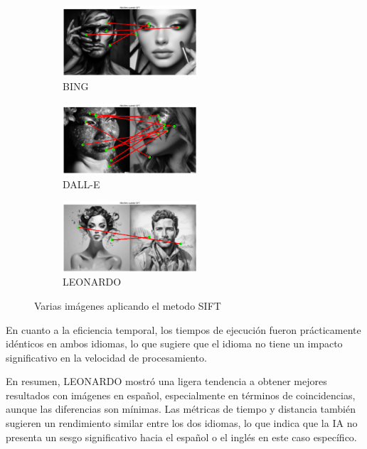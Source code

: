 \documentclass[unnumsec,webpdf,modern,large]{mam-authoring-template}
\theoremstyle{thmstyleone}%
\theoremstyle{thmstyletwo}%
\theoremstyle{thmstylethree}%
\begin{document}
\begin{figure}[htp]
    \centering
    \begin{subfigure}[]{}
        \includegraphics[width=5cm]{bing101.png}
        \caption{BING}
    \end{subfigure}
    \begin{subfigure}[]{}
        \includegraphics[width=5cm]{dall101.png}
        \caption{DALL-E}
    \end{subfigure}
    \begin{subfigure}[]{}
        \includegraphics[width=5cm]{leo101.png}
        \caption{LEONARDO}
    \end{subfigure}
    \caption{Varias imágenes aplicando el metodo SIFT}
    \label{fig:varias_imagenes}
\end{figure}

En cuanto a la eficiencia temporal, los tiempos de ejecución fueron prácticamente idénticos en ambos idiomas, lo que sugiere que el idioma no tiene un impacto significativo en la velocidad de procesamiento.

En resumen, LEONARDO mostró una ligera tendencia a obtener mejores resultados con imágenes en español, especialmente en términos de coincidencias, aunque las diferencias son mínimas. Las métricas de tiempo y distancia también sugieren un rendimiento similar entre los dos idiomas, lo que indica que la IA no presenta un sesgo significativo hacia el español o el inglés en este caso específico.
\end{document}
